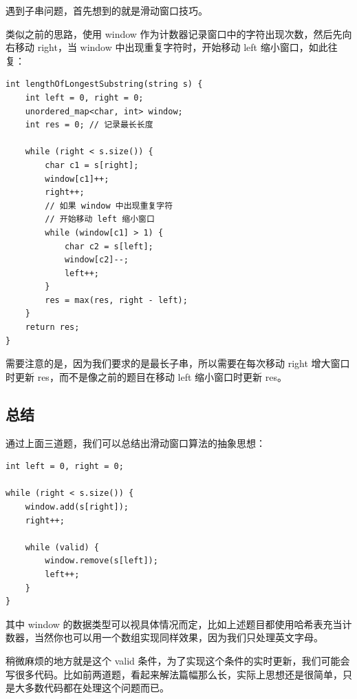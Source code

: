 \documentclass[12pt]{article}
\begin{document}
遇到子串问题，首先想到的就是滑动窗口技巧。

类似之前的思路，使用 window 作为计数器记录窗口中的字符出现次数，然后先向右移动 right，当 window 中出现重复字符时，开始移动 left 缩小窗口，如此往复：
\begin{lstlisting}
int lengthOfLongestSubstring(string s) {
    int left = 0, right = 0;
    unordered_map<char, int> window;
    int res = 0; // 记录最长长度

    while (right < s.size()) {
        char c1 = s[right];
        window[c1]++;
        right++;
        // 如果 window 中出现重复字符
        // 开始移动 left 缩小窗口
        while (window[c1] > 1) {
            char c2 = s[left];
            window[c2]--;
            left++;
        }
        res = max(res, right - left);
    }
    return res;
}
\end{lstlisting}
需要注意的是，因为我们要求的是最长子串，所以需要在每次移动 right 增大窗口时更新 res，而不是像之前的题目在移动 left 缩小窗口时更新 res。

\subsection{总结}
通过上面三道题，我们可以总结出滑动窗口算法的抽象思想：
\begin{lstlisting}
int left = 0, right = 0;

while (right < s.size()) {
    window.add(s[right]);
    right++;
    
    while (valid) {
        window.remove(s[left]);
        left++;
    }
}
\end{lstlisting}

其中 window 的数据类型可以视具体情况而定，比如上述题目都使用哈希表充当计数器，当然你也可以用一个数组实现同样效果，因为我们只处理英文字母。

稍微麻烦的地方就是这个 valid 条件，为了实现这个条件的实时更新，我们可能会写很多代码。比如前两道题，看起来解法篇幅那么长，实际上思想还是很简单，只是大多数代码都在处理这个问题而已。







\end{document}
